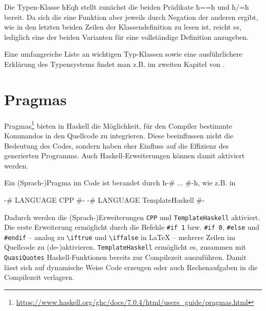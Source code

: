 Die Typen-Klasse ħEqħ stellt zunächst die beiden Prädikate ħ==ħ und ħ/=ħ
bereit. Da sich die eine Funktion aber jeweils durch Negation der anderen
ergibt, wie in den letzten beiden Zeilen der Klassendefinition zu lesen ist,
reicht es, lediglich eine der beiden Varianten für eine vollständige Definition
anzugeben.

Eine umfangreiche Liste an wichtigen Typ-Klassen sowie eine ausführlichere
Erklärung des Typensystems findet man z.B.
im zweiten Kapitel von \autocite{lyahfgg}.

\section{Pragmas}
Pragmas\footnote{\url{https://www.haskell.org/ghc/docs/7.0.4/html/users_guide/pragmas.html}}
bieten in Haskell die Möglichkeit, für den Compiler bestimmte Kommandos in den
Quellcode zu integrieren. Diese beeinflussen nicht die Bedeutung des
Codes, sondern haben eher Einfluss auf die Effizienz des generierten Programms.
Auch Haskell-Erweiterungen können damit aktiviert werden.

Ein (Sprach-)Pragma im Code ist berandet durch ħ{-# ... #-}ħ, wie z.B. in
\begin{hcode}
{-# LANGUAGE CPP #-}
{-# LANGUAGE TemplateHaskell #-}
\end{hcode}
Dadurch werden die (Sprach-)Erweiterungen \texttt{CPP} und
\texttt{TemplateHaskell} aktiviert. Die erste Erweiterung ermöglicht durch
die Befehle \texttt{\#if 1} bzw. \texttt{\#if 0}, \texttt{\#else} und
\texttt{\#endif} -- analog zu \verb!\iftrue! und
\verb!\iffalse! in \LaTeX{} -- mehrere Zeilen im Quellcode zu
(de-)aktivieren.
\texttt{TemplateHaskell} ermöglicht es, zusammen mit \texttt{QuasiQuotes}
Haskell-Funktionen bereits zur Compilezeit auszuführen. Damit lässt sich
auf dynamische Weise Code erzeugen oder auch Rechenaufgaben in die Compilezeit
verlagern.

